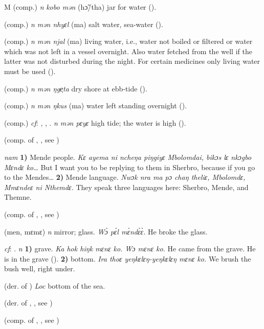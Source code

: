 \begin{letter}{M}
 (comp.) \textit{n} \textit{kobo mən} (hɔ̃/tha) jar for water (\citealt{Pichl1967}).

 (comp.) \textit{n} \textit{mən nhyɛl} (ma) salt water, sea-water (\citealt{Pichl1967}).

 (comp.) \textit{n} \textit{mən njal} (ma) living water, i.e., water not boiled or filtered or water which was not left in a vessel overnight. Also water fetched from the well if the latter was not disturbed during the night. For certain medicines only living water must be used (\citealt{Pichl1967}). 

 (comp.) \textit{n} \textit{mən ŋge̹ta} dry shore at ebb-tide (\citealt{Pichl1967}).

 (comp.) \textit{n} \textit{mən ŋkus} (ma) water left standing overnight (\citealt{Pichl1967}). 

 (comp.) \textit{cf}: , , . \textit{n} \textit{mən pɛyɛ} high tide; the water is high (\citealt{Pichl1967}).

 (comp. of , , see ) 

 \textit{nam} \textbf{1)} Mende people. \textit{Kɛ ayema ni ncheŋa piŋgiyɛ Mbolomdai, bikɔs lɛ nkɔgbo Mɛndɛ ko…} But I want you to be replying to them in Sherbro, because if you go to the Mendes… \textbf{2)} Mende language. \textit{Nwɔk nra ma pɔ chaŋ theliɛ, Mbolomdɛ, Mmɛndeɛ ni Nthemdɛ.} They speak three languages here: Sherbro, Mende, and Themne.

 (comp. of , , see ) 

 (men, mɛmɛ) \textit{n} mirror; glass. \textit{Wɔ̀ pɛ́l mɛ̀ndɛ̀ɛ̀.} He broke the glass.

 \textit{cf}: . \textit{n} \textbf{1)} grave. \textit{Ka hok hiŋk mɛnɛ ko. Wɔ mɛnɛ ko.} He came from the grave. He is in the grave (\citealt{Pichl1967}). \textbf{2)} bottom. \textit{Ira thoɛ yeŋkɛlɛŋ-yeŋkɛlɛŋ mɛnɛ ko.} We brush the bush well, right under.

 (der. of ) \textit{Loc} bottom of the sea.

 (der. of , , see ) 

 (comp. of , , see ) 


\end{letter}
